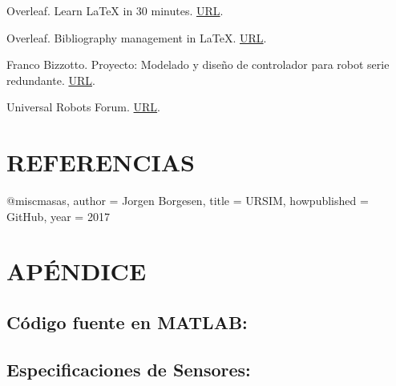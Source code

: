 \documentclass{article}
\begin{document}
Overleaf. Learn LaTeX in 30 minutes. \href{https://www.overleaf.com/learn/latex/Learn_LaTeX_in_30_minutes}{URL}.

Overleaf. Bibliography management in LaTeX. \href{https://www.overleaf.com/learn/latex/Bibliography_management_in_LaTeX}{URL}.

Franco Bizzotto. Proyecto: Modelado y diseño de controlador para robot serie redundante. \href{https://github.com/carloshernangarrido/control/blob/master/12_anteproyecto_proyecto-final/Bizzotto_Robot-serie.pdf}{URL}.

Universal Robots Forum. \href{https://forum.universal-robots.com/}{URL}.

\section*{REFERENCIAS}


@misc{masas,
    author       = {Jorgen Borgesen},
    title        = {URSIM},
    howpublished = {GitHub},
    year         = 2017
}



\section*{APÉNDICE}

\subsection*{Código fuente en MATLAB:}

\subsection*{Especificaciones de Sensores:}









\end{document}
